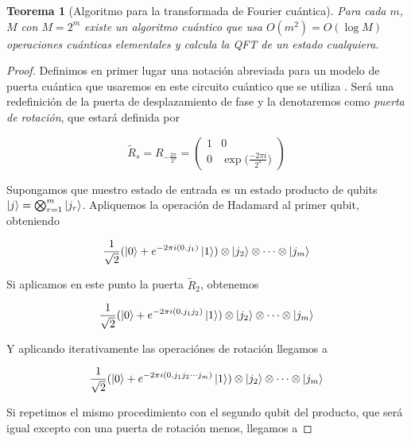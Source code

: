 \documentclass[11pt, spanish]{report}
\numberwithin{equation}{section}
\newtheorem{teo}[defin]{Teorema}
\numberwithin{defin}{section}
\newenvironment{yellowBox}{\begin{tcolorbox}[colback=yellow!5!white,colframe=yellow!75!black]}{\end{tcolorbox}}
\begin{document}
\begin{yellowBox}
\begin{teo}[Algoritmo para la transformada de Fourier cuántica]
Para cada $m$, $M$ con $M=2^m$ existe un algoritmo cuántico que usa $O(m^2)=O(\log M)$ operaciones cuánticas elementales y calcula la QFT de un estado cualquiera.
\end{teo}
\end{yellowBox}

\begin{proof}

Definimos en primer lugar una notación abreviada para un modelo de puerta cuántica que usaremos en este circuito cuántico que se utiliza \cite{shor}. Será una redefinición de la puerta de desplazamiento de fase y la denotaremos como \emph{puerta de rotación}, que estará definida por

\begin{equation}
\tilde{R}_s=R_{-\frac{2\pi}{2^s}}=\begin{pmatrix}
1 & 0 \\
0 & \exp\Big(\frac{-2\pi i}{2^s}\Big)
\end{pmatrix}
\end{equation}

Supongamos que nuestro estado de entrada es un estado producto de qubits $\ket{j}=\bigotimes_{r=1}^m\ket{j_r}$. Apliquemos la operación de Hadamard al primer qubit, obteniendo

\begin{equation}
\frac{1}{\sqrt{2}}(\ket{0}+e^{-2\pi i(0.j_1)}\ket{1})\otimes\ket{j_2}\otimes\cdots\otimes\ket{j_m}
\end{equation}

Si aplicamos en este punto la puerta $\tilde{R}_2$, obtenemos

\begin{equation}
\frac{1}{\sqrt{2}}(\ket{0}+e^{-2\pi i(0.j_1j_2)}\ket{1})\otimes\ket{j_2}\otimes\cdots\otimes\ket{j_m}
\end{equation}

Y aplicando iterativamente las operaciónes de rotación llegamos a 

\begin{equation}
\frac{1}{\sqrt{2}}(\ket{0}+e^{-2\pi i(0.j_1j_2\cdots j_m)}\ket{1})\otimes\ket{j_2}\otimes\cdots\otimes\ket{j_m}
\end{equation}

Si repetimos el mismo procedimiento con el segundo qubit del producto, que será igual excepto con una puerta de rotación menos, llegamos a 


\end{proof}
\end{document}

